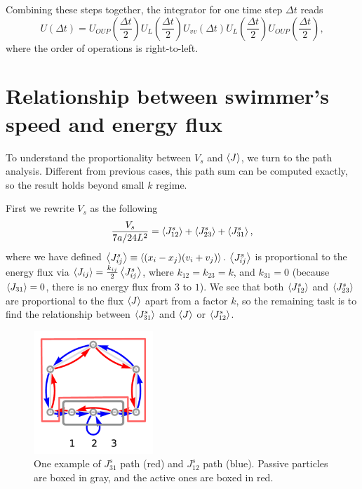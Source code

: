 \documentclass[
 amsmath,amssymb,
 aps,
 pre,
 longbibliography,
 10pt, onecolumn,
 notitlepage
]{revtex4-1}
\begin{document}
Combining these steps together, the integrator for one time step $\Delta t$ reads
\begin{equation}
    U(\Delta t) = U_{OUP}(\frac{\Delta t}{2})U_{L}(\frac{\Delta t}{2})U_{vv}(\Delta t)U_{L}(\frac{\Delta t}{2})U_{OUP}(\frac{\Delta t}{2}),
\end{equation}
where the order of operations is right-to-left.


\section{Relationship between swimmer's speed and energy flux}
To understand the proportionality between $V_s$ and $\expval{J}$, we turn to the path analysis. Different from previous cases, this path sum can be computed exactly, so the result holds beyond small $k$ regime.

First we rewrite $V_s$ as the following
\begin{equation}
    \frac{V_s}{7a/24L^2} = \expval{J_{12}^s} + \expval{J_{23}^s} + \expval{J_{31}^s}, \label{eqnS:swimmer_Vs}
\end{equation}
where we have defined $\expval{J_{ij}^s} \equiv \expval{(x_i-x_j)(v_i+v_j)}$. $\expval{J_{ij}^s}$ is proportional to the energy flux via $\expval{J_{ij}} = \frac{k_{ij}}{2}\expval{J_{ij}^s}$, where $k_{12}=k_{23}=k$, and $k_{31}=0$ (because $\expval{J_{31}} = 0$, there is no energy flux from $3$ to $1$).
We see that both $\expval{J_{12}^s}$ and $\expval{J_{23}^s}$ are proportional to the flux $\expval{J}$ apart from a factor $k$, so the remaining task is to find the relationship between $\expval{J_{31}^s}$ and $\expval{J}$ or $\expval{J_{12}^s}$.

\begin{figure}[ht]
	\centering
	\includegraphics[width=0.4\textwidth]{swimmer_path.pdf}
    \caption{
        One example of $J_{31}^s$ path (red) and $J_{12}^s$ path (blue). Passive particles are boxed in gray, and the active ones are boxed in red.
    }
    \label{fig:swimmer_path}
\end{figure}
\end{document}
